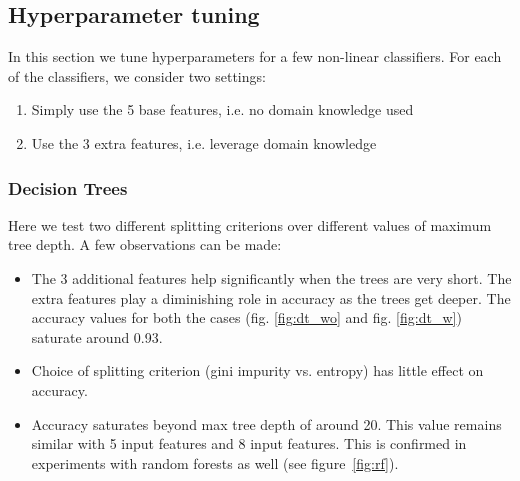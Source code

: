 \documentclass{article}
\begin{document}
\subsection{Hyperparameter tuning}
\label{sec:tuning}
In this section we tune hyperparameters for a few non-linear classifiers. For each of the classifiers, we consider two settings:
\begin{enumerate} 
\item Simply use the 5 base features, i.e. no domain knowledge used
\item Use the 3 extra features, i.e. leverage domain knowledge
\end{enumerate}

\subsubsection{Decision Trees}
Here we test two different splitting criterions over different values of maximum tree depth. A few observations can be made:
\begin{itemize}
\item The 3 additional features help significantly when the trees are very short. The extra features play a diminishing role in accuracy as the trees get deeper. The accuracy values for both the cases (fig. \ref{fig:dt_wo} and fig. \ref{fig:dt_w}) saturate around 0.93.
\item Choice of splitting criterion (gini impurity vs. entropy) has little effect on accuracy.
\item Accuracy saturates beyond max tree depth of around 20. This value remains similar with 5 input features and 8 input features. This is confirmed in experiments with random forests as well (see figure~\ref{fig:rf}).
\end{itemize}
\end{document}
